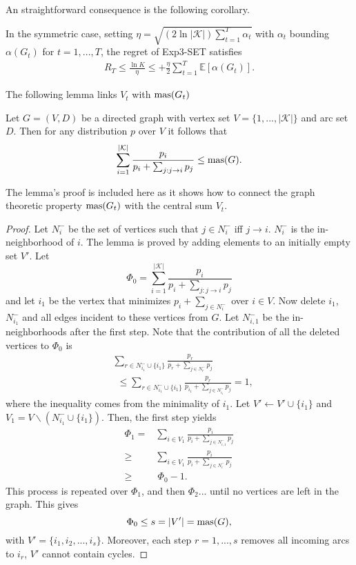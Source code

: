 An straightforward consequence is the following corollary.

\begin{corollary} \label{alon:corollary}
	In the symmetric case, setting $\eta=\sqrt{(2\ln |\mathcal{K}|)\sum_{t=1}^T\alpha_t}$ with $\alpha_t$ bounding $\alpha(G_t)$ for $t=1,...,T$, the regret of Exp3-SET satisfies 
	\begin{align}
		R_T\leq \frac{\ln K}{\eta} \leq +\frac{\eta}{2}\sum_{t=1}^T\mathbb{E}[\alpha(G_t)].
	\end{align}
\end{corollary}

The following lemma links $V_t$ with $\text{mas}(G_t)$

\begin{lemma}
	Let $G=(V,D)$ be a directed graph with vertex set $V=\{1,...,|\mathcal{K}|\}$ and arc set $D$. Then for any distribution $p$ over $V$ it follows that
	\begin{align}
		\sum_{i=1}^{|\mathcal{K}|}\frac{p_i}{p_i+\sum_{j:j\to i}p_j}\leq \text{mas}(G).
	\end{align}
\end{lemma}

The lemma's proof is included here as it shows how to connect the graph theoretic property $\text{mas}(G_t)$ with the central sum $V_t$. 
\begin{proof}
	Let $N_i^-$ be the set of vertices such that $j\in N_i^-$ iff $j\to i$. $N_i^-$ is the in-neighborhood of $i$. The lemma is proved by adding elements to an initially empty set $V'$. Let 
	$$\Phi_0=\sum_{i=1}^{|\mathcal{K}|}\frac{p_i}{p_i+\sum_{j:j\to i}p_j}$$
	and let $i_1$ be the vertex that minimizes $p_i+\sum_{j\in N_i^-}$ over $i\in V$. Now delete $i_1$, $N_{i_1}^-$ and all edges incident to these vertices from $G$. Let $N_{i,1}^-$ be the in-neighborhoods after the first step. Note that the contribution of all the deleted vertices to $\Phi_0$ is 
	\begin{align*}
		&\sum_{r\in N_{i_1}^-\cup\{i_1\}}\frac{p_r}{p_r+\sum_{j\in N_r^-}p_j}\\
		&\:\:\leq \sum_{r\in N_{i_1}^-\cup\{i_1\}}\frac{p_r}{p_{i_1}+\sum_{j\in N_{i_1}^-}p_j}=1,
	\end{align*}
	where the inequality comes from the minimality of $i_1$. Let $V'\leftarrow V'\cup \{i_1\}$ and $V_1=V\backslash (N_{i_1}^-\cup\{i_1\})$. Then, the first step yields
	\begin{align*}
		\Phi_1=&\sum_{i\in V_1}\frac{p_i}{p_i+\sum_{j\in N_{i,1}^-}p_j}\\
		\geq & \sum_{i\in V_1}\frac{p_i}{p_i+\sum_{j\in N_i^-}p_j}\\
		\geq &\:\Phi_0-1.
	\end{align*}
	This process is repeated over $\Phi_1$, and then $\Phi_2$... until no vertices are left in the graph. This gives $$\Phi_0\leq s=|V'|=\text{mas}(G),$$ with $V'=\{i_1, i_2,...,i_s\}.$ Moreover, each step $r=1,...,s$ removes all incoming arcs to $i_r$, $V'$ cannot contain cycles. 
\end{proof}

